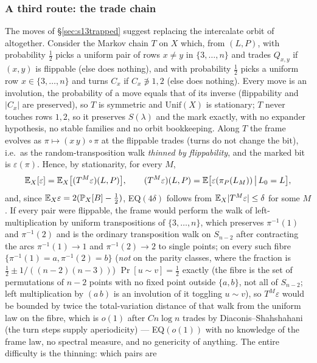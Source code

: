 \subsubsection{A third route: the trade chain}\label{sec:s13tradechain}

The moves of \S\ref{sec:s13trapped} suggest replacing the intercalate
orbit of \cite{KPS25} altogether.  Consider the Markov chain $T$ on
$X$ which, from $(L,P)$, with probability $\tfrac12$ picks a uniform
pair of rows $x\ne y$ in $\{3,\dots,n\}$ and trades $Q_{x,y}$ if
$(x,y)$ is flippable (else does nothing), and with probability
$\tfrac12$ picks a uniform row $x\in\{3,\dots,n\}$ and turns $C_x$ if
$C_x\not\ni1,2$ (else does nothing).  Every move is an involution,
the probability of a move equals that of its inverse (flippability
and $|C_x|$ are preserved), so $T$ is symmetric and
$\mathrm{Unif}(X)$ is stationary; $T$ never touches rows $1,2$, so it
preserves $S(\lambda)$ and the mark exactly, with no expander
hypothesis, no stable families and no orbit bookkeeping.  Along $T$
the frame evolves as $\pi\mapsto(x\,y)\circ\pi$ at the flippable
trades (turns do not change the bit), i.e.\ as the random-transposition
walk \emph{thinned by flippability}, and the marked bit is
$\varepsilon(\pi)$.  Hence, by stationarity, for every $M$,
\[
\mathbb{E}_X[\varepsilon]=\mathbb{E}_X\bigl[(T^M\varepsilon)(L,P)\bigr],
\qquad
(T^M\varepsilon)(L,P)=\mathbb{E}\bigl[\varepsilon(\pi_P(L_M))\,\big|\,L_0=L\bigr],
\]
and, since $\mathbb{E}_X\varepsilon=2(\mathbb{P}_X[B]-\tfrac12)$, EQ$(4\delta)$
follows from $\mathbb{E}_X|T^M\varepsilon|\le\delta$ for some $M$.  If every
pair were flippable, the frame would perform the walk of
left-multiplication by uniform transpositions of $\{3,\dots,n\}$,
which preserves $\pi^{-1}(1)$ and $\pi^{-1}(2)$ and is the ordinary
transposition walk on $S_{n-2}$ after contracting the arcs
$\pi^{-1}(1)\to1$ and $\pi^{-1}(2)\to2$ to single points; on every such
fibre $\{\pi^{-1}(1)=a,\pi^{-1}(2)=b\}$ (\emph{not} on the parity classes, where the fraction is $\tfrac12\pm1/((n-2)(n-3))$) $\Pr[u\sim v]=\tfrac12$ exactly (the fibre is the set of permutations of $n-2$ points with no fixed point outside $\{a,b\}$, not all of $S_{n-2}$; left multiplication by $(a\,b)$ is an involution of it toggling $u\sim v$), so $T^M\varepsilon$ would be bounded by
twice the total-variation distance of that walk from the uniform
law on the fibre, which is $o(1)$ after $Cn\log n$ trades by
Diaconis--Shahshahani (the turn steps supply aperiodicity) ---
EQ$(o(1))$ with no knowledge of the frame law, no spectral measure, and
no genericity of anything.  The entire difficulty is the thinning: which pairs are

